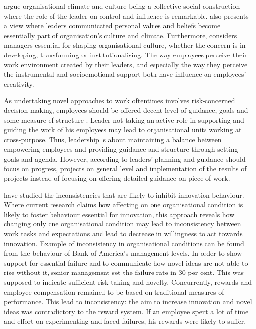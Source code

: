 \citet{mumford2002leading} argue organisational climate and culture being a collective social construction where the role of the leader on control and influence is remarkable. \citet{schein2010organizational} also presents a view where leaders communicated personal values and beliefs become essentially part of organisation's culture and climate. Furthermore,\citet{jung2001transformational} considers managers essential for shaping organisational culture, whether the concern is in developing, transforming or institutionalising. The way employees perceive their work environment created by their leaders, and especially the way they perceive the instrumental and socioemotional support both have influence on employees' creativity. \citep{oldham1996employee}

As undertaking novel approaches to work oftentimes involves risk-concerned decision-making, employees should be offered decent level of guidance, goals and some measure of structure \citep{jung2003role}. Leader not taking an active role in supporting and guiding the work of his employees may lead to organisational units working at cross-purpose. Thus, leadership is about maintaining a balance between empowering employees and providing guidance and structure through setting goals and agenda. However, according to \citet{mumford2002leading} leaders' planning and guidance should focus on progress, projects on general level and implementation of the results of projects instead of focusing on offering detailed guidance on piece of work. 

\citet{lee2004mixed} have studied the inconsistencies that are likely to inhibit innovation behaviour. Where current research claims how affecting on one organisational condition is likely to foster behaviour essential for innovation, this approach reveals how changing only one organisational condition may lead to inconsistency between work tasks and expectations and lead to decrease in willingness to act towards innovation. Example of inconsistency in organisational conditions can be found from the behaviour of Bank of America's management levels. In order to show support for essential failure and to communicate how novel ideas are not able to rise without it, senior management set the failure rate in 30 per cent. This was supposed to indicate sufficient risk taking and novelty. Concurrently, rewards and employee compensation remained to be based on traditional measures of performance. This lead to inconsistency: the aim to increase innovation and novel ideas was contradictory to the reward system. If an employee spent a lot of time and effort on experimenting and faced failures, his rewards were likely to suffer. \citep{lee2004mixed} 

